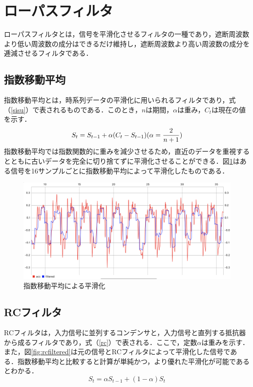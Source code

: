 \section{ローパスフィルタ}
ローパスフィルタとは，信号を平滑化させるフィルタの一種であり，遮断周波数より低い周波数の成分はできるだけ維持し，遮断周波数より高い周波数の成分を逓減させるフィルタである．

\subsection{指数移動平均}
指数移動平均とは，時系列データの平滑化に用いられるフィルタであり，式（\ref{sisu}）で表されるものである．このとき，$n$は期間，$\alpha$は重み，$C_{t}$は現在の値を示す．
\begin{equation}
  \label{sisu}
  S_{t} = S_{t-1} +  \alpha (C_{t} - S_{t-1}) \\
  ( \alpha = \frac{2}{n+1} )
\end{equation}
指数移動平均では指数関数的に重みを減少させるため，直近のデータを重視するとともに古いデータを完全に切り捨てずに平滑化させることができる．図\ref{fig:sisu}はある信号を16サンプルごとに指数移動平均によって平滑化したものである．

\begin{figure}[tbp]
  \begin{center}
  \includegraphics[width=1\hsize]{image/Fig-sisu.png}
  \caption{指数移動平均による平滑化}
  \label{fig:sisu}
  \end{center}
\end{figure}


\subsection{RCフィルタ}
RCフィルタは，入力信号に並列するコンデンサと，入力信号と直列する抵抗器から成るフィルタであり，式（\ref{rc}）で表される．ここで，定数$\alpha$は重みを示す．
また，図\ref{fig:rcfiltered}は元の信号とRCフィルタによって平滑化した信号である．指数移動平均と比較すると計算が単純かつ，より優れた平滑化が可能であるとわかる．
\begin{equation}
  \label{rc}
  S_{t} = \alpha S_{t-1} + (1- \alpha) S_{t}
\end{equation}

